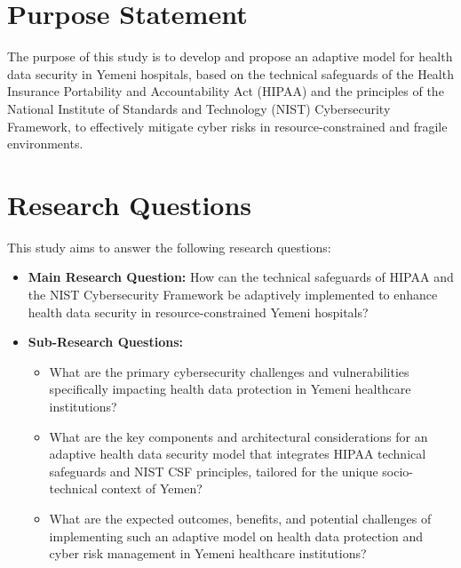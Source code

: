 \documentclass[12pt, a4paper, oneside]{report}
\begin{document}
	\section{Purpose Statement} 
	The purpose of this study is to develop and propose an adaptive model for health data security in Yemeni hospitals, based on the technical safeguards of the Health Insurance Portability and Accountability Act (HIPAA) and the principles of the National Institute of Standards and Technology (NIST) Cybersecurity Framework, to effectively mitigate cyber risks in resource-constrained and fragile environments.
	
	\section{Research Questions}
	This study aims to answer the following research questions:
	\begin{itemize}
		\item \textbf{Main Research Question:} How can the technical safeguards of HIPAA and the NIST Cybersecurity Framework be adaptively implemented to enhance health data security in resource-constrained Yemeni hospitals?
		\item \textbf{Sub-Research Questions:}
		\begin{itemize}
			\item[-] What are the primary cybersecurity challenges and vulnerabilities specifically impacting health data protection in Yemeni healthcare institutions?
			\item[-] What are the key components and architectural considerations for an adaptive health data security model that integrates HIPAA technical safeguards and NIST CSF principles, tailored for the unique socio-technical context of Yemen?
			\item [-] What are the expected outcomes, benefits, and potential challenges of implementing such an adaptive model on health data protection and cyber risk management in Yemeni healthcare institutions?
		\end{itemize}
	\end{itemize}
	
\end{document}
